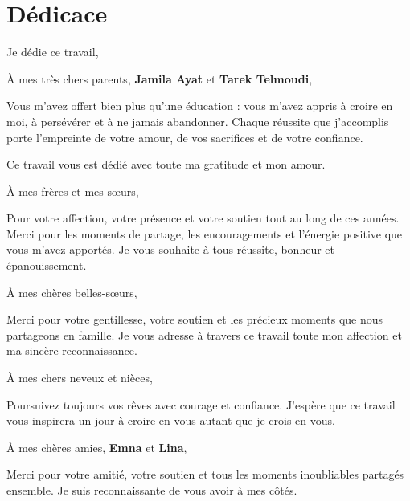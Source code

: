 \clearpage
\chapter*{Dédicace}

\begin{center}
\begin{minipage}{0.9\textwidth}
\centering
\small
{}

Je dédie ce travail,

\vspace{0.25cm}

\noindent À mes très chers parents, \textbf{Jamila Ayat} et \textbf{Tarek Telmoudi},

Vous m'avez offert bien plus qu'une éducation : vous m'avez appris à croire en moi, à persévérer et à ne jamais abandonner. Chaque réussite que j'accomplis porte l'empreinte de votre amour, de vos sacrifices et de votre confiance.

Ce travail vous est dédié avec toute ma gratitude et mon amour.

\vspace{0.18cm}

\noindent À mes frères et mes sœurs,

Pour votre affection, votre présence et votre soutien tout au long de ces années. Merci pour les moments de partage, les encouragements et l'énergie positive que vous m'avez apportés. Je vous souhaite à tous réussite, bonheur et épanouissement.

\vspace{0.18cm}

\noindent À mes chères belles-sœurs,

Merci pour votre gentillesse, votre soutien et les précieux moments que nous partageons en famille. Je vous adresse à travers ce travail toute mon affection et ma sincère reconnaissance.

\vspace{0.18cm}

\noindent À mes chers neveux et nièces,

Poursuivez toujours vos rêves avec courage et confiance. J'espère que ce travail vous inspirera un jour à croire en vous autant que je crois en vous.

\vspace{0.18cm}

\noindent À mes chères amies, \textbf{Emna} et \textbf{Lina},

Merci pour votre amitié, votre soutien et tous les moments inoubliables partagés ensemble. Je suis reconnaissante de vous avoir à mes côtés.


\end{minipage}
\end{center}
